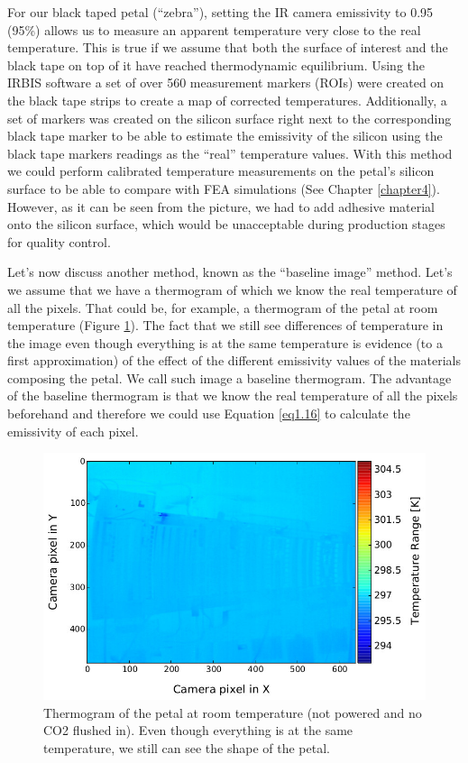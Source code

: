 		For our black taped petal (“zebra”), setting the IR camera emissivity to 0.95 (95\%) allows us to measure an apparent temperature very close to the real temperature. This is true if we assume that both the surface of interest and the black tape on top of it have reached thermodynamic equilibrium. Using the IRBIS software a set of over 560 measurement markers (ROIs) were created on the black tape strips to create a map of corrected temperatures. Additionally, a set of markers was created on the silicon surface right next to the corresponding black tape marker to be able to estimate the emissivity of the silicon using the black tape markers readings as the “real” temperature values. With this method we could perform calibrated temperature measurements on the petal’s silicon surface to be able to compare with FEA simulations (See Chapter \ref{chapter4}). However, as it can be seen from the picture, we had to add adhesive material onto the silicon surface, which would be unacceptable during production stages for quality control. 
		
		Let’s now discuss another method, known as the “baseline image” method. Let's we assume that we have a thermogram of which we know the real temperature of all the pixels. That could be, for example, a thermogram of the petal at room temperature (Figure \ref{fig3.3}). The fact that we still see differences of temperature in the image even though everything is at the same temperature is evidence (to a first approximation) of the effect of the different emissivity values of the materials composing the petal. We call such image a baseline thermogram. The advantage of the baseline thermogram is that we know the real temperature of all the pixels beforehand and therefore we could use Equation \ref{eq1.16} to calculate the emissivity of each pixel. 
	
		\begin{figure}[ht!]
			\centering
			\captionsetup{justification=centering,margin=2cm}
			\includegraphics[scale=0.55]{Figures/Chapter03/thermo_Temp_201708091701_avg.jpg}
			\caption{Thermogram of the petal at room temperature (not powered and no CO2 flushed in). Even though everything is at the same temperature, we still can see the shape of the petal.}\label{fig3.3}
		\end{figure}
	
